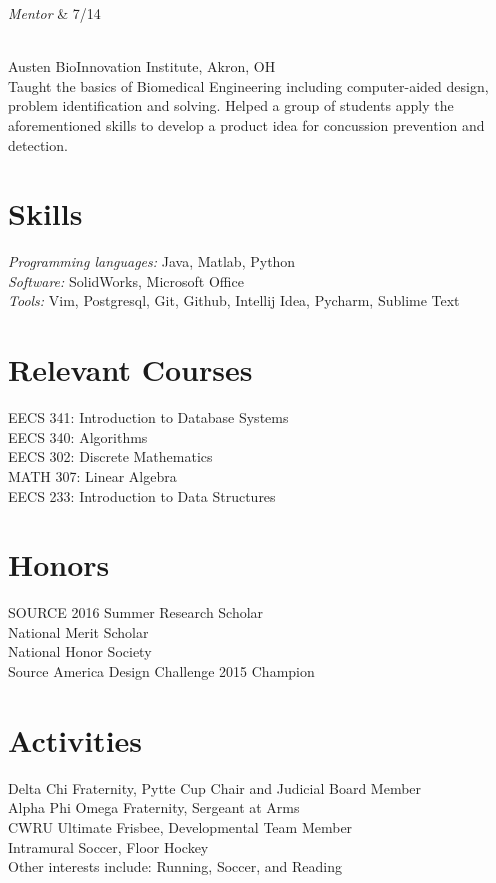 \documentclass{res}
\begin{document}
{\begin{resume}
\begin{ncolumn}{2}
{\it Mentor} & 7/14
\end{ncolumn}\\  
Austen BioInnovation Institute, Akron, OH \\
Taught the basics of Biomedical Engineering including computer-aided design, problem identification and solving. Helped a group of students apply the aforementioned skills to develop a product idea for concussion prevention and detection.
 
\section{\bf  Skills}
\textit{Programming languages:} Java, Matlab, Python\\
\textit{Software:} SolidWorks, Microsoft Office\\
\textit{Tools: } Vim, Postgresql, Git, Github, Intellij Idea, Pycharm, Sublime Text

\section{\bf Relevant Courses}
EECS 341: Introduction to Database Systems\\
EECS 340: Algorithms\\
EECS 302: Discrete Mathematics\\
MATH 307: Linear Algebra\\
EECS 233: Introduction to Data Structures\\
\section{\bf  Honors}
SOURCE 2016 Summer Research Scholar\\
National Merit Scholar \\
National Honor Society\\
Source America Design Challenge 2015 Champion

 
\section{\bf  Activities}
Delta Chi Fraternity, Pytte Cup Chair and Judicial Board Member\\
Alpha Phi Omega Fraternity, Sergeant at Arms \\
CWRU Ultimate Frisbee, Developmental Team Member \\
Intramural Soccer, Floor Hockey \\
Other interests include: Running, Soccer, and Reading 


\end{resume}

\vfill} %
\end{document}
